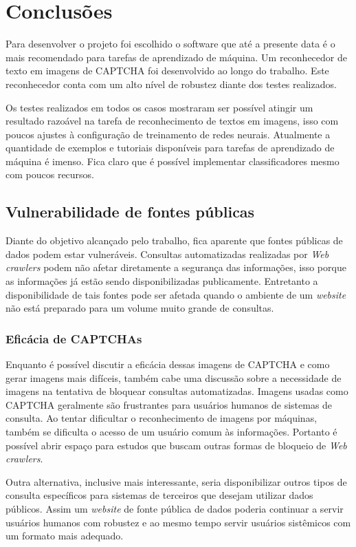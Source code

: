\chapter{ Conclusões }

Para desenvolver o projeto foi escolhido o software que até a presente
data é o mais recomendado para tarefas de aprendizado de máquina. Um
reconhecedor de texto em imagens de CAPTCHA foi desenvolvido ao longo
do trabalho. Este reconhecedor conta com um alto nível de robustez
diante dos testes realizados.

Os testes realizados em todos os casos mostraram ser possível atingir um
resultado razoável na tarefa de reconhecimento de textos em imagens,
isso com poucos ajustes à configuração de treinamento de redes
neurais. Atualmente a quantidade de exemplos e tutoriais disponíveis
para tarefas de aprendizado de máquina é imenso. Fica claro que é
possível implementar classificadores mesmo com poucos recursos.

\section{Vulnerabilidade de fontes públicas}

Diante do objetivo alcançado pelo trabalho, fica aparente que fontes
públicas de dados podem estar vulneráveis. Consultas automatizadas
realizadas por \textit{Web crawlers} podem não afetar diretamente a
segurança das informações, isso porque as informações já estão sendo
disponibilizadas publicamente. Entretanto a disponibilidade de tais
fontes pode ser afetada quando o ambiente de um \textit{website} não
está preparado para um volume muito grande de consultas.

\subsection{Eficácia de CAPTCHAs}

Enquanto é possível discutir a eficácia dessas imagens de CAPTCHA e
como gerar imagens mais difíceis, também cabe uma discussão sobre a
necessidade de imagens na tentativa de bloquear consultas
automatizadas. Imagens usadas como CAPTCHA geralmente são frustrantes
para usuários humanos de sistemas de consulta. Ao tentar dificultar o
reconhecimento de imagens por máquinas, também se dificulta o acesso
de um usuário comum às informações. Portanto é possível abrir espaço
para estudos que buscam outras formas de bloqueio de \textit{Web
  crawlers}. 

Outra alternativa, inclusive mais interessante, seria
disponibilizar outros tipos de consulta específicos para sistemas de
terceiros que desejam utilizar dados públicos. Assim um
\textit{website} de fonte pública de dados poderia continuar a servir
usuários humanos com robustez e ao mesmo tempo servir usuários
sistêmicos com um formato mais adequado.

